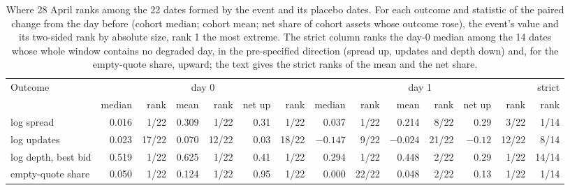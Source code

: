 \begin{table}[htbp]
\centering\scriptsize\setlength{\tabcolsep}{2pt}
\begin{tabular}{lrrrrrrrrrrrrr}
\toprule
Outcome & \multicolumn{6}{c}{day 0} & \multicolumn{6}{c}{day 1} & strict \\
\cmidrule(lr){2-7}\cmidrule(lr){8-13}
 & median & rank & mean & rank & net up & rank & median & rank & mean & rank & net up & rank & rank \\
\midrule
log spread & 0.016 & 1/22 & 0.309 & 1/22 & 0.31 & 1/22 & 0.037 & 1/22 & 0.214 & 8/22 & 0.29 & 3/22 & 1/14 \\
log updates & 0.023 & 17/22 & 0.070 & 12/22 & 0.03 & 18/22 & $-0.147$ & 9/22 & $-0.024$ & 21/22 & $-0.12$ & 12/22 & 8/14 \\
log depth, best bid & 0.519 & 1/22 & 0.625 & 1/22 & 0.41 & 1/22 & 0.294 & 1/22 & 0.448 & 2/22 & 0.29 & 1/22 & 14/14 \\
empty-quote share & 0.050 & 1/22 & 0.124 & 1/22 & 0.95 & 1/22 & 0.000 & 22/22 & 0.048 & 2/22 & 0.13 & 1/22 & 1/14 \\
\bottomrule
\end{tabular}
\caption{Where 28 April ranks among the 22 dates formed by the event and its placebo dates. For each outcome and statistic of the paired change from the day before (cohort median; cohort mean; net share of cohort assets whose outcome rose), the event's value and its two-sided rank by absolute size, rank 1 the most extreme. The strict column ranks the day-0 median among the 14 dates whose whole window contains no degraded day, in the pre-specified direction (spread up, updates and depth down) and, for the empty-quote share, upward; the text gives the strict ranks of the mean and the net share.}
\label{tab:placebo}
\end{table}
